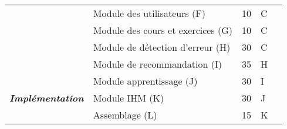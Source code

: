 \begin{table}[hbtp]
\begin{tabular}{|ll|ll|l}
\multicolumn{1}{|l|}{}                                                                                                                            & Module des utilisateurs (F)                                   & \multicolumn{1}{l|}{10}                              & C                               &                          \\ \cline{2-4}
\multicolumn{1}{|l|}{}                                                                                                                            & Module des cours et exercices (G)                             & \multicolumn{1}{l|}{10}                              & C                               &                          \\ \cline{2-4}
\multicolumn{1}{|l|}{}                                                                                                                            & Module de détection d’erreur (H)                              & \multicolumn{1}{l|}{30}                              & C                               &                          \\ \cline{2-4}
\multicolumn{1}{|l|}{}                                                                                                                            & Module de recommandation (I)                                  & \multicolumn{1}{l|}{35}                              & H                               &                          \\ \cline{2-4}
\multicolumn{1}{|l|}{}                                                                                                                            & Module apprentissage (J)                                      & \multicolumn{1}{l|}{30}                              & I                               &                          \\ \cline{2-4}
\multicolumn{1}{|l|}{\multirow{-6}{*}{\textit{\textbf{Implémentation}}}}                                                                          & Module IHM (K)                                                & \multicolumn{1}{l|}{30}                              & J                               &                          \\ \cline{1-4}
\multicolumn{1}{|l|}{}                                                                                                                            & Assemblage (L)                                                & \multicolumn{1}{l|}{15}                              & K                               &                          \\ \cline{2-4}

\end{tabular}
\end{table}
